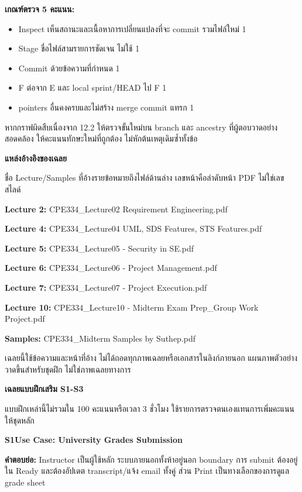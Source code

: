 \textbf{เกณฑ์ตรวจ 5 คะแนน:}
\begin{itemize}
\item Inspect เห็นสถานะและเนื้อหาการเปลี่ยนแปลงที่จะ commit รวมไฟล์ใหม่ 1
\item Stage ชื่อไฟล์สามรายการชัดเจน ไม่ใช้  1
\item Commit ด้วยข้อความที่กำหนด 1
\item F ต่อจาก E และ local sprint/HEAD ไป F 1
\item pointers อื่นคงครบและไม่สร้าง merge commit แทรก 1
\end{itemize}
หากกราฟผิดสืบเนื่องจาก 12.2 ให้ตรวจขั้นใหม่บน branch และ ancestry ที่ผู้ตอบวาดอย่างสอดคล้อง ให้คะแนนทักษะใหม่ที่ถูกต้อง ไม่หักต้นเหตุเดิมซ้ำทั้งข้อ

\medskip
\begingroup\fontsize{9}{11}\selectfont
\textbf{แหล่งอ้างอิงของเฉลย}\par
ชื่อ Lecture/Samples ที่อ้างรายข้อหมายถึงไฟล์ด้านล่าง เลขหน้าคือลำดับหน้า PDF ไม่ใช่เลขสไลด์\par
\textbf{Lecture 2:} CPE334\_Lecture02 Requirement Engineering.pdf\par
\textbf{Lecture 4:} CPE334\_Lecture04 UML, SDS Features, STS Features.pdf\par
\textbf{Lecture 5:} CPE334\_Lecture05 - Security in SE.pdf\par
\textbf{Lecture 6:} CPE334\_Lecture06 - Project Management.pdf\par
\textbf{Lecture 7:} CPE334\_Lecture07 - Project Execution.pdf\par
\textbf{Lecture 10:} CPE334\_Lecture10 - Midterm Exam Prep\_Group Work Project.pdf\par
\textbf{Samples:} CPE334\_Midterm Samples by Suthep.pdf\par
เฉลยนี้ใช้ข้อความและหน้าที่อ้าง ไม่ได้ถอดทุกภาพเฉลยหรือเอกสารในลิงก์ภายนอก แผนภาพตัวอย่างวาดขึ้นสำหรับชุดฝึก ไม่ใช่ภาพเฉลยทางการ\par
\endgroup
\ifMockExamSupplements
\newpage
\textbf{\Large เฉลยแบบฝึกเสริม S1-S3}\par
แบบฝึกเหล่านี้ไม่รวมใน 100 คะแนนหรือเวลา 3 ชั่วโมง ใช้รายการตรวจตนเองแทนการเพิ่มคะแนนให้ชุดหลัก\par
\medskip
\textbf{S1\quad Use Case: University Grades Submission}\par
{}
\textbf{คำตอบย่อ:} Instructor เป็นผู้ใช้หลัก ระบบภายนอกทั้งห้าอยู่นอก boundary การ submit ต้องอยู่ใน Ready และต้องอัปเดต transcript/แจ้ง email ทั้งคู่ ส่วน Print เป็นทางเลือกของการดูแล grade sheet\par
